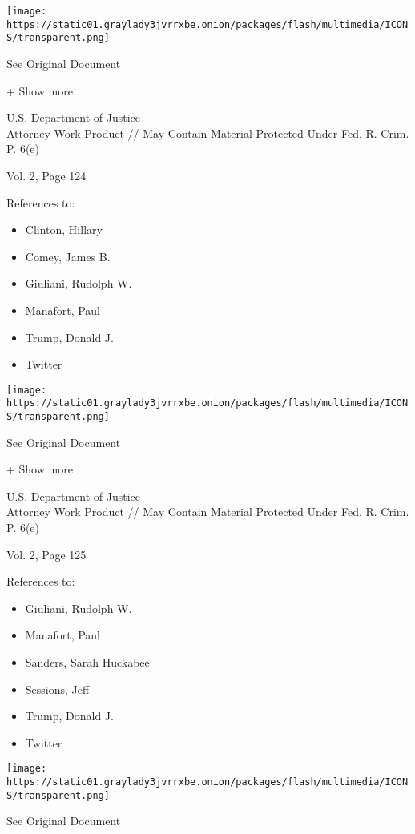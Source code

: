 \protect\hyperlink{}{}

\texttt{[image: https://static01.graylady3jvrrxbe.onion/packages/flash/multimedia/ICONS/transparent.png]}

See Original Document

+ Show more

U.S. Department of Justice\\
Attorney Work Product // May Contain Material Protected Under Fed. R.
Crim. P. 6(e)

Vol. 2, Page 124

References to:

\begin{itemize}
\tightlist
\item
  Clinton, Hillary
\item
  Comey, James B.
\item
  Giuliani, Rudolph W.
\item
  Manafort, Paul 
\item
  Trump, Donald J.
\item
  Twitter
\end{itemize}

\protect\hyperlink{}{}

\texttt{[image: https://static01.graylady3jvrrxbe.onion/packages/flash/multimedia/ICONS/transparent.png]}

See Original Document

+ Show more

U.S. Department of Justice\\
Attorney Work Product // May Contain Material Protected Under Fed. R.
Crim. P. 6(e)

Vol. 2, Page 125

References to:

\begin{itemize}
\tightlist
\item
  Giuliani, Rudolph W.
\item
  Manafort, Paul 
\item
  Sanders, Sarah Huckabee
\item
  Sessions, Jeff
\item
  Trump, Donald J.
\item
  Twitter
\end{itemize}

\protect\hyperlink{}{}

\texttt{[image: https://static01.graylady3jvrrxbe.onion/packages/flash/multimedia/ICONS/transparent.png]}

See Original Document

